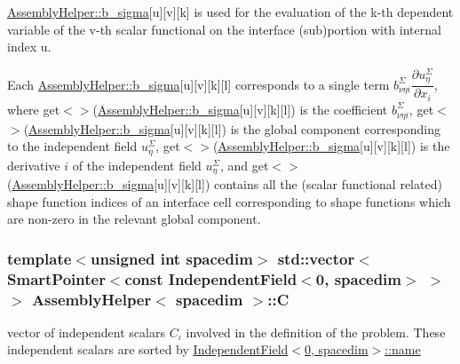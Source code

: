 \hyperlink{class_assembly_helper_af58c9a1c7093edc306070913aa1b9be2}{Assembly\+Helper\+::b\+\_\+sigma}\mbox{[}{\ttfamily u}\mbox{]}\mbox{[}{\ttfamily v}\mbox{]}\mbox{[}{\ttfamily k}\mbox{]} is used for the evaluation of the {\ttfamily k-\/th} dependent variable of the {\ttfamily v-\/th} scalar functional on the interface (sub)portion with internal index {\ttfamily u}.

Each \hyperlink{class_assembly_helper_af58c9a1c7093edc306070913aa1b9be2}{Assembly\+Helper\+::b\+\_\+sigma}\mbox{[}{\ttfamily u}\mbox{]}\mbox{[}{\ttfamily v}\mbox{]}\mbox{[}{\ttfamily k}\mbox{]}\mbox{[}{\ttfamily l}\mbox{]} corresponds to a single term $b^\Sigma_{\nu \eta i} \dfrac{\partial u^\Sigma_\eta}{\partial x_i}$, where {\ttfamily get$<${$>$}(\hyperlink{class_assembly_helper_af58c9a1c7093edc306070913aa1b9be2}{Assembly\+Helper\+::b\+\_\+sigma}}\mbox{[}{\ttfamily u}\mbox{]}\mbox{[}{\ttfamily v}\mbox{]}\mbox{[}{\ttfamily k}\mbox{]}\mbox{[}{\ttfamily l}\mbox{]}) is the coefficient $b^\Sigma_{\nu \eta i}$, {\ttfamily get$<${$>$}(\hyperlink{class_assembly_helper_af58c9a1c7093edc306070913aa1b9be2}{Assembly\+Helper\+::b\+\_\+sigma}}\mbox{[}{\ttfamily u}\mbox{]}\mbox{[}{\ttfamily v}\mbox{]}\mbox{[}{\ttfamily k}\mbox{]}\mbox{[}{\ttfamily l}\mbox{]}) is the global component corresponding to the independent field $u^\Sigma_\eta$, {\ttfamily get$<${$>$}(\hyperlink{class_assembly_helper_af58c9a1c7093edc306070913aa1b9be2}{Assembly\+Helper\+::b\+\_\+sigma}}\mbox{[}{\ttfamily u}\mbox{]}\mbox{[}{\ttfamily v}\mbox{]}\mbox{[}{\ttfamily k}\mbox{]}\mbox{[}{\ttfamily l}\mbox{]}) is the derivative $i$ of the independent field $u^\Sigma_\eta$, and {\ttfamily get$<${$>$}(\hyperlink{class_assembly_helper_af58c9a1c7093edc306070913aa1b9be2}{Assembly\+Helper\+::b\+\_\+sigma}}\mbox{[}{\ttfamily u}\mbox{]}\mbox{[}{\ttfamily v}\mbox{]}\mbox{[}{\ttfamily k}\mbox{]}\mbox{[}{\ttfamily l}\mbox{]}) contains all the (scalar functional related) shape function indices of an interface cell corresponding to shape functions which are non-\/zero in the relevant global component. 
\subsubsection[{\texorpdfstring{C}{C}}]{\setlength{\rightskip}{0pt plus 5cm}template$<$unsigned int spacedim$>$ std\+::vector$<${\bf Smart\+Pointer}$<$const {\bf Independent\+Field}$<$0, spacedim$>$ $>$ $>$ {\bf Assembly\+Helper}$<$ spacedim $>$\+::C\hspace{0.3cm}{\ttfamily [private]}}\hypertarget{class_assembly_helper_aa5234a46be82cfe7d92678169d38f326}{}\label{class_assembly_helper_aa5234a46be82cfe7d92678169d38f326}
vector of independent scalars $C_\iota$ involved in the definition of the problem. These independent scalars are sorted by \hyperlink{class_independent_field_3_010_00_01spacedim_01_4_a05ecdcc8310253f055fbc59abaa2bc90}{Independent\+Field$<$0, spacedim$>$\+::name} 
